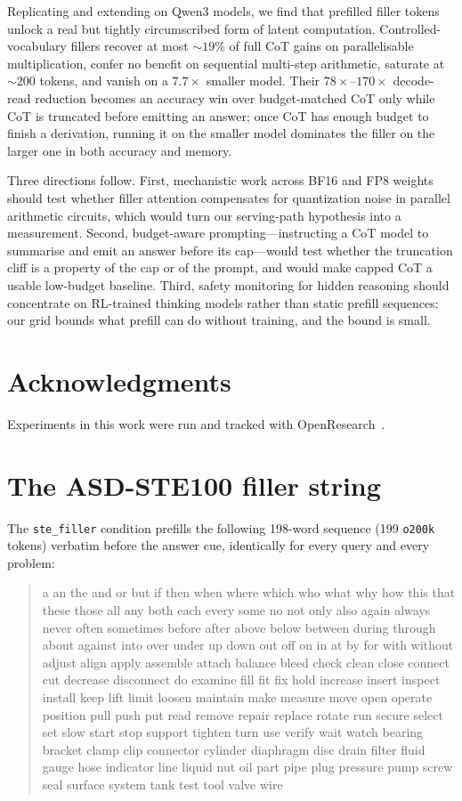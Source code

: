 \documentclass[11pt,a4paper]{article}
\begin{document}
Replicating and extending \citet{baherwani2026not} on Qwen3 models, we find that
prefilled filler tokens unlock a real but tightly circumscribed form of latent
computation. Controlled-vocabulary fillers recover at most ${\sim}19\%$ of full
CoT gains on parallelisable multiplication, confer no benefit on sequential
multi-step arithmetic, saturate at ${\sim}200$ tokens, and vanish on a
$7.7\times$ smaller model. Their $78\times$--$170\times$ decode-read reduction
becomes an accuracy win over budget-matched CoT only while CoT is truncated before
emitting an answer; once CoT has enough budget to finish a derivation, running it
on the smaller model dominates the filler on the larger one in both accuracy and
memory.

Three directions follow. First, mechanistic work across BF16 and FP8 weights
should test whether filler attention compensates for quantization noise in
parallel arithmetic circuits, which would turn our serving-path hypothesis into a
measurement. Second, budget-aware prompting---instructing a CoT model to
summarise and emit an answer before its cap---would test whether the truncation
cliff is a property of the cap or of the prompt, and would make capped CoT a
usable low-budget baseline. Third, safety monitoring for hidden reasoning should
concentrate on RL-trained thinking models rather than static prefill sequences:
our grid bounds what prefill can do without training, and the bound is small.

\section*{Acknowledgments}
Experiments in this work were run and tracked with
OpenResearch~\citep{openresearch}.

\appendix
\section{The ASD-STE100 filler string}
\label{app:filler}

The \texttt{ste\_filler} condition prefills the following 198-word sequence
(199 \texttt{o200k} tokens) verbatim before the answer cue, identically for every
query and every problem:

\begin{quote}\footnotesize\ttfamily\raggedright\sloppy
a an the and or but if then when where which who what why how this that these
those all any both each every some no not only also again always never often
sometimes before after above below between during through about against into
over under up down out off on in at by for with without adjust align apply
assemble attach balance bleed check clean close connect cut decrease disconnect
do examine fill fit fix hold increase insert inspect install keep lift limit
loosen maintain make measure move open operate position pull push put read
remove repair replace rotate run secure select set slow start stop support
tighten turn use verify wait watch bearing bracket clamp clip connector cylinder
diaphragm disc drain filter fluid gauge hose indicator line liquid nut oil part
pipe plug pressure pump screw seal surface system tank test tool valve wire
\end{quote}
\end{document}

